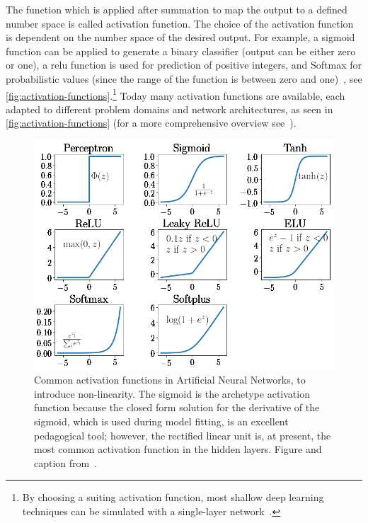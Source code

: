 The function which is applied after summation to map the output to a defined number space is called activation function.
The choice of the activation function is dependent on the number space of the desired output.
For example, a sigmoid function can be applied to generate a binary classifier (output can be either zero or one), a \gls{relu} function is used for prediction of positive integers, and Softmax for probabilistic values (since the range of the function is between zero and one)~\autocite{Sharma2020}, see \autoref{fig:activation-functions}.\footnote{By choosing a suiting activation function, most shallow deep learning techniques can be simulated with a single-layer network~\autocite[Chapter~1.2.1]{Aggarwal2018}.}
Today many activation functions are available, each adapted to different problem domains and network architectures, as seen in \autoref{fig:activation-functions} (for a more comprehensive overview see~\autocite{Sharma2020}).
\begin{figure}[!htb]
    \centering
    \includegraphics[width=\textwidth]{pictures/activation_functions}
    \caption[Common activation functions]{Common activation functions in Artificial Neural Networks, to introduce non-linearity. The sigmoid is the archetype activation function because the closed form solution for the derivative of the sigmoid, which is used during model fitting, is an excellent pedagogical tool; however, the rectified linear unit is, at present, the most common activation function in the hidden layers. Figure and caption from~\autocite{Johnson2020}.}
    \label{fig:activation-functions}
\end{figure}

